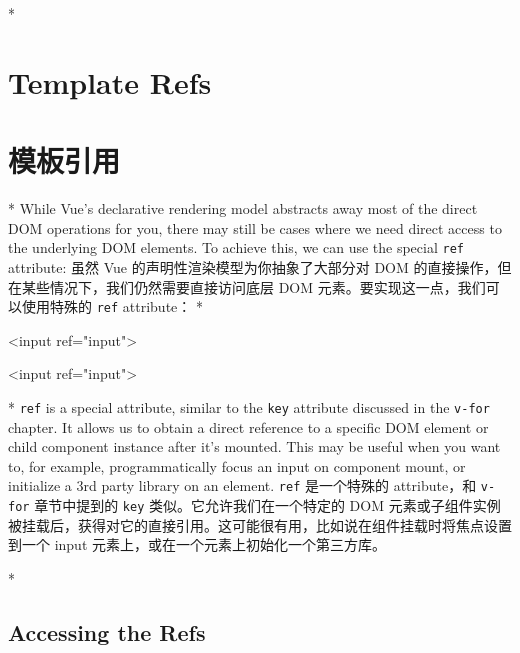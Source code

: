 \begin{paracol}{2}

\switchcolumn[0]*%
\section{Template Refs}
\switchcolumn
\section{模板引用}
\switchcolumn[0]*%
While Vue's declarative rendering model abstracts away most of the
direct DOM operations for you, there may still be cases where we need
direct access to the underlying DOM elements. To achieve this, we can
use the special \texttt{ref} attribute:
\switchcolumn
虽然 Vue 的声明性渲染模型为你抽象了大部分对 DOM
的直接操作，但在某些情况下，我们仍然需要直接访问底层 DOM
元素。要实现这一点，我们可以使用特殊的 \texttt{ref} attribute：
\switchcolumn[0]*%
\begin{codeHtml}
<input ref="input">
\end{codeHtml}
\switchcolumn
\begin{codeHtml}
<input ref="input">
\end{codeHtml}

\switchcolumn[0]*%
\texttt{ref} is a special attribute, similar to the \texttt{key}
attribute discussed in the \texttt{v-for} chapter. It allows us to
obtain a direct reference to a specific DOM element or child component
instance after it's mounted. This may be useful when you want to, for
example, programmatically focus an input on component mount, or
initialize a 3rd party library on an element.
\switchcolumn
\texttt{ref} 是一个特殊的 attribute，和 \texttt{v-for} 章节中提到的
\texttt{key} 类似。它允许我们在一个特定的 DOM
元素或子组件实例被挂载后，获得对它的直接引用。这可能很有用，比如说在组件挂载时将焦点设置到一个
input 元素上，或在一个元素上初始化一个第三方库。


\switchcolumn[0]*%
\subsection{Accessing the Refs}
\switchcolumn

\end{paracol}
